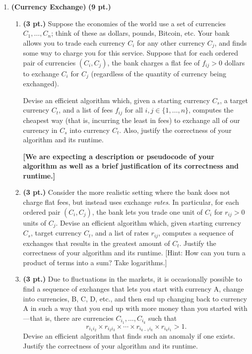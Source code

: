 \documentclass{article}
\begin{document}
\begin{enumerate}
    \item \textbf{(Currency Exchange)} \textbf{(9 pt.)}
    \begin{enumerate}
      \item \textbf{(3 pt.)} Suppose the economies of the world use a set of
        currencies $C_1,\ldots,C_n$; think of these as dollars, pounds, Bitcoin,
        etc. Your bank allows you to trade each currency $C_i$ for any other
        currency $C_j$, and finds some way to charge you for this service.
        Suppose that for each ordered pair of currencies $(C_i,C_j)$, the bank
        charges a flat fee of $f_{ij} > 0$ dollars to exchange $C_i$ for $C_j$
        (regardless of the quantity of currency being exchanged).

        Devise an efficient algorithm which, given a starting currency $C_s$, a
        target currency $C_t$, and a list of fees $f_{ij}$ for all
        $i,j \in \{1,\ldots,n\}$, computes the cheapest way (that is, incurring
        the least in fees) to exchange all of our currency in $C_s$ into
        currency $C_t$. Also, justify the correctness of your algorithm and its
        runtime.

        \textbf{[We are expecting a description or pseudocode of your algorithm
        as well as a brief justification of its correctness and runtime.]}

      \item \textbf{(3 pt.)} Consider the more realistic setting where the bank
        does not charge flat fees, but instead uses exchange \emph{rates}. In
        particular, for each ordered pair $(C_i,C_j)$, the bank lets you trade
        one unit of $C_i$ for $r_{ij} > 0$ units of $C_j$. Devise an efficient
        algorithm which, given starting currency $C_s$, target currency $C_t$,
        and a list of rates $r_{ij}$, computes a sequence of exchanges that
        results in the greatest amount of $C_t$.  Justify the correctness of
        your algorithm and its runtime. [Hint: How can you turn a product of
        terms into a sum?  Take logarithms.]

      \item \textbf{(3 pt.)} Due to fluctuations in the markets, it is
        occasionally possible to find a sequence of exchanges that lets you
        start with currency A, change into currencies, B, C, D, etc., and then
        end up changing back to currency A in such a way that you end up with
        more money than you started with---that is, there are currencies
        $C_{i_1},\ldots,C_{i_k}$ such that
        \[ r_{i_1 i_2} \times r_{i_2 i_3} \times \cdots \times r_{i_{k-1} i_k} \times r_{i_k i_1} > 1 . \]
        Devise an efficient algorithm that finds such an anomaly if one exists.
        Justify the correctness of your algorithm and its runtime.
    \end{enumerate}


\end{enumerate}
\end{document}
